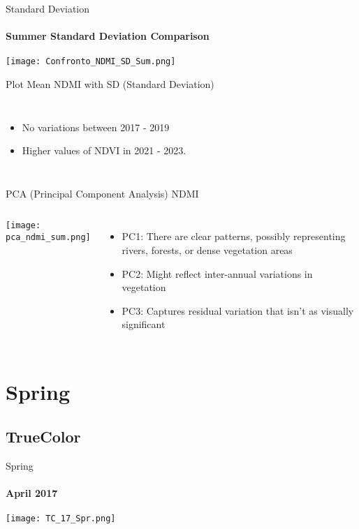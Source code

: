 \documentclass[10pt]{beamer}
\begin{document}
\begin{frame}{Standard Deviation}
\framesubtitle{Summer Standard Deviation Comparison}
    \centering
    \texttt{[image: Confronto\_NDMI\_SD\_Sum.png]}
\end{frame}


\begin{frame}{Plot Mean NDMI with SD (Standard Deviation)}
    \begin{columns}
            \begin{itemize}
                \item<1->No variations between 2017 - 2019
                \item<2->Higher values of NDVI in 2021 - 2023.
            \end{itemize}
    \end{columns}
    
\end{frame}

\begin{frame}{PCA (Principal Component Analysis) NDMI}
    \begin{columns}
            \texttt{[image: pca\_ndmi\_sum.png]}

            \begin{itemize}
                \item PC1: There are clear patterns, possibly representing rivers, forests, or dense vegetation areas 
                \item PC2: Might reflect inter-annual variations in vegetation
                \item PC3: Captures residual variation that isn’t as visually significant
            \end{itemize}
    \end{columns}
    
\end{frame}
\section{Spring}
\subsection{TrueColor}
\begin{frame}{Spring}
    \framesubtitle{April 2017}
        \centering
        \texttt{[image: TC\_17\_Spr.png]}
\end{frame}
\end{document}
